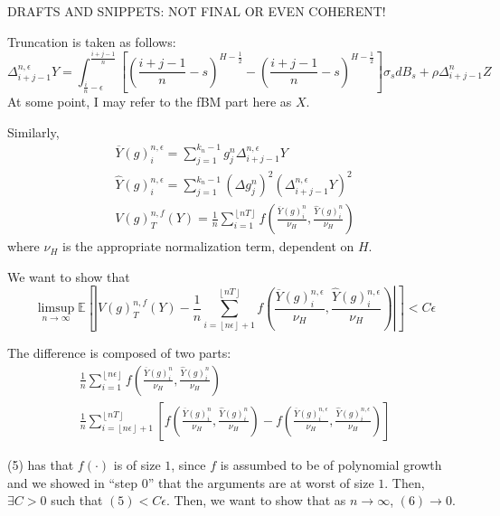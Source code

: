 \documentclass[12pt,letterpaper]{article}
\theoremstyle{definition}
\newcommand{\E}{\mathbb{E}}
\begin{document}
\pagebreak
DRAFTS AND SNIPPETS: NOT FINAL OR EVEN COHERENT!

Truncation is taken as follows:
\begin{equation}
  \Delta_{i+j-1}^{n,\epsilon} Y =  \int_{\frac{i}{n}-\epsilon}^{\frac{i+j-1}{n}} \left[ \left( \frac{i+j-1}{n} -s \right)^{H - \frac{1}{2}} - \left( \frac{i+j-1}{n} -s \right)^{H - \frac{1}{2}} \right]\sigma_s dB_s + \rho\Delta_{i+j-1}^n Z
\end{equation}
At some point, I may refer to the fBM part here as \(X\).

Similarly,
\begin{gather}
  \overline{Y}(g)^{n,\epsilon}_i = \sum_{j=1}^{k_n-1} g^n_j \Delta_{i+j-1}^{n,\epsilon} Y \\
  \widehat{Y}(g)^{n,\epsilon}_i = \sum_{j=1}^{k_n-1} (\Delta g^n_j)^2 (\Delta_{i+j-1}^{n,\epsilon} Y)^2 \\
  V(g)^{n,f}_T(Y) = \frac{1}{n}\sum_{i=1}^{\left\lfloor nT \right\rfloor} f\left( \frac{\overline{Y}(g)^n_i}{\nu_H}, \frac{\widehat{Y}(g)^n_i}{\nu_H} \right)
\end{gather}
where \(\nu_H\) is the appropriate normalization term, dependent on \(H\).

We want to show that
\[
  \limsup_{n \rightarrow \infty} \E \left[ \left| V(g)^{n,f}_T(Y) - \frac{1}{n}\sum_{i=\left\lfloor n\epsilon \right\rfloor + 1}^{\left\lfloor nT \right\rfloor} f\left( \frac{\overline{Y}(g)^{n,\epsilon}_i}{\nu_H}, \frac{\widehat{Y}(g)^{n,\epsilon}_i}{\nu_H} \right) \right| \right] < C\epsilon
\]

The difference is composed of two parts:
\begin{gather}
  \frac{1}{n}\sum_{i=1}^{\left\lfloor n\epsilon \right\rfloor} f\left( \frac{\overline{Y}(g)^n_i}{\nu_H}, \frac{\widehat{Y}(g)^n_i}{\nu_H} \right) \\
  \frac{1}{n}\sum_{i=\left\lfloor n\epsilon \right\rfloor + 1}^{\left\lfloor nT \right\rfloor}\left[ f\left( \frac{\overline{Y}(g)^{n}_i}{\nu_H}, \frac{\widehat{Y}(g)^{n}_i}{\nu_H} \right) -  f\left( \frac{\overline{Y}(g)^{n,\epsilon}_i}{\nu_H}, \frac{\widehat{Y}(g)^{n,\epsilon}_i}{\nu_H} \right) \right]
\end{gather}

(5) has that \(f(\cdot)\) is of size \(1\), since \(f\) is assumbed to be of polynomial growth and we showed in ``step 0'' that the arguments are at worst of size \(1\). Then, \(\exists C > 0\) such that \((5) < C\epsilon\). Then, we want to show that as \(n \rightarrow \infty\), \((6) \rightarrow 0\).
\end{document}
